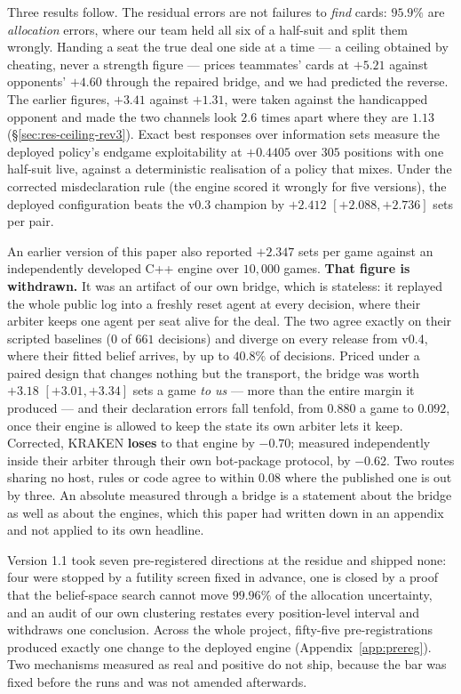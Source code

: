 \documentclass[11pt,letterpaper]{article}
\begin{document}
Three results follow. The residual errors are not failures to \emph{find}
cards: $\mathbf{95.9\%}$ are \emph{allocation} errors, where our team held all
six of a half-suit and split them wrongly. Handing a seat the true deal one
side at a time --- a ceiling obtained by cheating, never a strength figure ---
prices teammates' cards at $+5.21$ against opponents' $+4.60$ through the
repaired bridge, and we had predicted the reverse. The earlier figures,
$+3.41$ against $+1.31$, were taken against the handicapped opponent and made
the two channels look $2.6$ times apart where they are $1.13$
(\S\ref{sec:res-ceiling-rev3}). Exact best responses over information sets measure the
deployed policy's endgame exploitability at $+0.4405$ over $305$ positions with
one half-suit live, against a deterministic realisation of a policy that
mixes. Under the corrected misdeclaration rule (the engine scored it wrongly
for five versions), the deployed configuration beats the v0.3 champion by
$\mathbf{+2.412}$ $[+2.088, +2.736]$ sets per pair.

An earlier version of this paper also reported $+2.347$ sets per game
against an independently developed C++ engine over $10{,}000$ games.
\textbf{That figure is withdrawn.} It was an artifact of our own bridge, which is stateless: it
replayed the whole public log into a freshly reset agent at every decision,
where their arbiter keeps one agent per seat alive for the deal. The two agree
exactly on their scripted baselines ($0$ of $661$ decisions) and diverge on
every release from v0.4, where their fitted belief arrives, by up to $40.8\%$ of
decisions. Priced under a paired design that changes nothing but the transport,
the bridge was worth $\mathbf{+3.18}$ $[+3.01, +3.34]$ sets a game \emph{to us}
--- more than the entire margin it produced --- and their declaration errors
fall tenfold, from $0.880$ a game to $0.092$, once their engine is allowed to
keep the state its own arbiter lets it keep. Corrected, KRAKEN \textbf{loses} to
that engine by $-0.70$; measured independently inside their arbiter through
their own bot-package protocol, by $-0.62$. Two routes sharing no host, rules or
code agree to within $0.08$ where the published one is out by three. An absolute
measured through a bridge is a statement about the bridge as well as about the
engines, which this paper had written down in an appendix and not applied to its
own headline.

Version 1.1 took seven pre-registered directions at the residue and shipped
none: four were stopped by a futility screen fixed in advance, one is closed by
a proof that the belief-space search cannot move $99.96\%$ of the allocation
uncertainty, and an audit of our own clustering restates every position-level
interval and withdraws one conclusion. Across the whole project,
fifty-five
pre-registrations produced exactly one change to the deployed engine
(Appendix~\ref{app:prereg}). Two mechanisms measured as real and positive do
not ship, because the bar was fixed before the runs and was not amended
afterwards.
\end{document}
